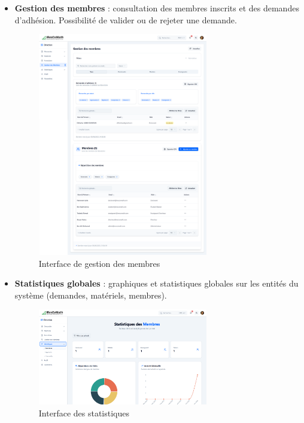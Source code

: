 \begin{itemize}
    \item \textbf{Gestion des membres} : consultation des membres inscrits et des demandes d’adhésion. Possibilité de valider ou de rejeter une demande.
    \begin{figure}[H]
        \centering
        \includegraphics[width=0.7\textwidth]{images/interface/Membres.png}
        \caption{Interface de gestion des membres}
        \label{fig:gestion_membres_directeur}
    \end{figure}

    \item \textbf{Statistiques globales} : graphiques et statistiques globales sur les entités du système (demandes, matériels,  membres).
    \begin{figure}[H]
        \centering
        \includegraphics[width=0.7\textwidth]{images/interface/Statistiques.png}
        \caption{Interface des statistiques}
        \label{fig:statistiques}
    \end{figure}
\end{itemize}

